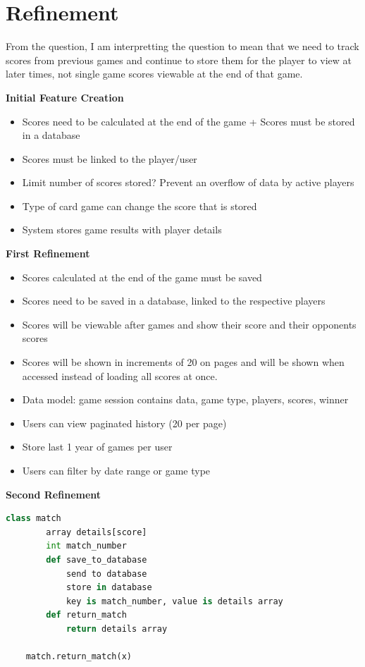 \documentclass[12pt]{article}
\begin{document}
\maketitlepage

\section{Refinement}

From the question, I am interpretting the question to mean that we need to
track scores from previous games and continue to store them for the player to view
at later times, not single game scores viewable at the end of that game.

\textbf{Initial Feature Creation}
\begin{itemize}
    \item Scores need to be calculated at the end of the game + Scores must be stored in a database
    \item Scores must be linked to the player/user
    \item Limit number of scores stored? Prevent an overflow of data by active players
    \item Type of card game can change the score that is stored
    \item System stores game results with player details
\end{itemize}

\textbf{First Refinement}
\begin{itemize}
    \item Scores calculated at the end of the game must be saved
    \item Scores need to be saved in a database, linked to the respective players
    \item Scores will be viewable after games and show their score and their opponents scores
    \item Scores will be shown in increments of 20 on pages and will be shown when accessed instead of loading all scores at once.
    \item Data model: game session contains data, game type, players, scores, winner
    \item Users can view paginated history (20 per page)
    \item Store last 1 year of games per user
    \item Users can filter by date range or game type
\end{itemize}

\textbf{Second Refinement}
\begin{lstlisting}[language=Python]
    class match
        array details[score]
        int match_number
        def save_to_database
            send to database
            store in database
            key is match_number, value is details array
        def return_match
            return details array

    match.return_match(x)
\end{lstlisting}
\end{document}
